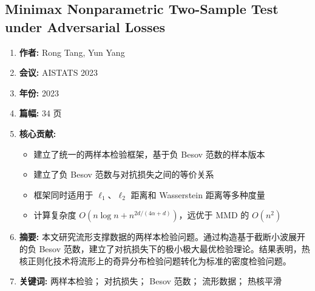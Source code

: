 \subsection{Minimax Nonparametric Two-Sample Test under Adversarial Losses}
\begin{enumerate}
    \item \textbf{作者:} Rong Tang, Yun Yang
    \item \textbf{会议:} AISTATS 2023
    \item \textbf{年份:} 2023
    \item \textbf{篇幅:} 34 页
    \item \textbf{核心贡献:}
        \begin{itemize}
            \item 建立了统一的两样本检验框架，基于负 Besov 范数的样本版本
            \item 建立了负 Besov 范数与对抗损失之间的等价关系
            \item 框架同时适用于 $\ell_1$、$\ell_2$ 距离和 Wasserstein 距离等多种度量
            \item 计算复杂度 $O(n\log n + n^{2d/(4\alpha+d)})$，远优于 MMD 的 $O(n^2)$
        \end{itemize}
    \item \textbf{摘要:} 本文研究流形支撑数据的两样本检验问题。通过构造基于截断小波展开的负 Besov 范数，建立了对抗损失下的极小极大最优检验理论。结果表明，热核正则化技术将流形上的奇异分布检验问题转化为标准的密度检验问题。
    \item \textbf{关键词:} 两样本检验； 对抗损失； Besov 范数； 流形数据； 热核平滑
\end{enumerate}

